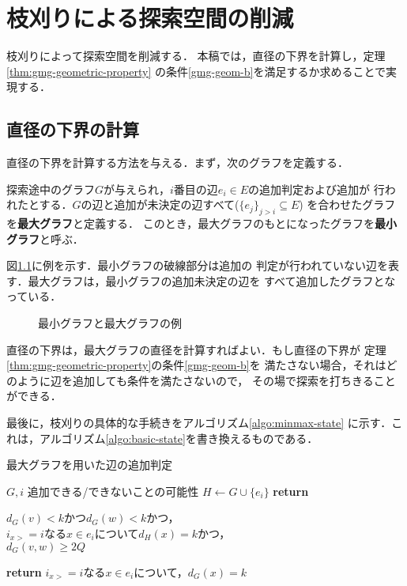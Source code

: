 
\chapter{枝刈りによる探索空間の削減}
\label{chap:reduce-by-prune}
枝刈りによって探索空間を削減する．
本稿では，直径の下界を計算し，定理\ref{thm:gmg-geometric-property}
の条件\ref{gmg-geom-b}を満足するか求めることで実現する．

\section{直径の下界の計算}
\label{sect:distance-lower-bound}
直径の下界を計算する方法を与える．まず，次のグラフを定義する．
\begin{definition}
  探索途中のグラフ$G$が与えられ，$i$番目の辺$e_i\in E$の追加判定および追加が
  行われたとする．$G$の辺と追加が未決定の辺すべて($\{e_j\}_{j>i}\subseteq E$)
  を合わせたグラフを\textbf{最大グラフ}と定義する．
  このとき，最大グラフのもとになったグラフを\textbf{最小グラフ}と呼ぶ．
\end{definition}
\begin{example}
  図\ref{fig:min-max-graph}に例を示す．最小グラフの破線部分は追加の
  判定が行われていない辺を表す．最大グラフは，最小グラフの追加未決定の辺を
  すべて追加したグラフとなっている．
\end{example}
\begin{figure}
  \centering
  \hfill
  \caption{最小グラフと最大グラフの例}
  \label{fig:min-max-graph}
\end{figure}

直径の下界は，最大グラフの直径を計算すればよい．もし直径の下界が
定理\ref{thm:gmg-geometric-property}の条件\ref{gmg-geom-b}を
満たさない場合，それはどのように辺を追加しても条件を満たさないので，
その場で探索を打ちきることができる．

最後に，枝刈りの具体的な手続きをアルゴリズム\ref{algo:minmax-state}
に示す．これは，アルゴリズム\ref{algo:basic-state}を書き換えるものである．
\begin{algorithm}[H]
  \caption{最大グラフを用いた辺の追加判定}
  \begin{algorithmic}[1]
    \Require $G,i$
    \Ensure 追加できる/できないことの可能性
    \State $H\gets G\cup\{e_i\}$
    \State \textbf{return} \parbox[t]{\linewidth}{
      $d_G(v)<k$かつ$d_G(w)<k$かつ，\\
      $i_{x>}=i$なる$x\in e_i$について$d_H(x)=k$かつ， \\
      $d_G(v,w)\geq2Q$
    }
    \EndProcedure
    \State \textbf{return} $i_{x>}=i$なる$x\in e_i$について，$d_G(x)=k$
    \EndProcedure
  \end{algorithmic}
\end{algorithm}

